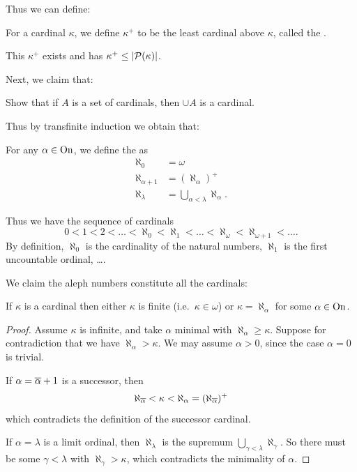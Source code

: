Thus we can define:
\begin{definition}
	For a cardinal $\kappa$, we define $\kappa^+$ to be the least cardinal above $\kappa$,
	called the .
\end{definition}
This $\kappa^+$ exists and has $\kappa^+ \le \left\lvert \mathcal P(\kappa) \right\rvert$.

Next, we claim that:
\begin{exercise}
	Show that if $A$ is a set of cardinals, then $\cup A$ is a cardinal.
\end{exercise}

Thus by transfinite induction we obtain that:
\begin{definition}
	For any $\alpha \in \mathrm{On}$, we define the  as
	\begin{align*}
		\aleph_0 &= \omega \\
		\aleph_{\alpha+1} &= \left( \aleph_\alpha \right)^+ \\
		\aleph_{\lambda} &= \bigcup_{\alpha < \lambda} \aleph_\alpha.
	\end{align*}
\end{definition}

Thus we have the sequence of cardinals
\[
	0 < 1 < 2 < \dots < \aleph_0 < \aleph_1 < \dots < \aleph_\omega < \aleph_{\omega+1} < \dots.
\]
By definition, $\aleph_0$ is the cardinality of the natural numbers,
$\aleph_1$ is the first uncountable ordinal, \dots.

We claim the aleph numbers constitute all the cardinals:
\begin{lemma}
	If $\kappa$ is a cardinal then
	either $\kappa$ is finite (i.e.\ $\kappa \in \omega$) or
	$\kappa = \aleph_\alpha$ for some $\alpha \in \mathrm{On}$.
\end{lemma}
\begin{proof}
	Assume $\kappa$ is infinite, and take $\alpha$ minimal with $\aleph_\alpha \ge \kappa$.
	Suppose for contradiction that we have $\aleph_\alpha > \kappa$.
	We may assume $\alpha > 0$, since the case $\alpha = 0$ is trivial.

	If $\alpha = \overline\alpha + 1$ is a successor, then
	\[ \aleph_{\overline\alpha} < \kappa < \aleph_{\alpha}
		= (\aleph_{\overline\alpha})^+ \]
	which contradicts the definition of the successor cardinal.

	If $\alpha = \lambda$ is a limit ordinal, then $\aleph_\lambda$ is the
	supremum $\bigcup_{\gamma < \lambda} \aleph_\gamma$.
	So there must be some $\gamma < \lambda$ with $\aleph_\gamma > \kappa$,
	which contradicts the minimality of $\alpha$.
\end{proof}

